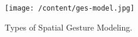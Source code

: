 \begin{figure}
	[h] \centering 
	\texttt{[image: /content/ges-model.jpg]} \caption{Types of Spatial Gesture Modeling. \cite{2}} \label{fg:ges:model} 
\end{figure}
